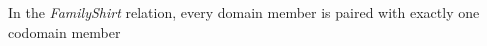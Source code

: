 \documentclass{ximera}
\begin{document}
\begin{exercise}
\begin{question}
\begin{multipleChoice}
\end{multipleChoice}
\end{question}








\begin{question} 
In the \textit{FamilyShirt} relation, every domain member is paired with exactly one codomain member

\begin{multipleChoice}
\end{multipleChoice}
\end{question}







\end{exercise}
\end{document}
